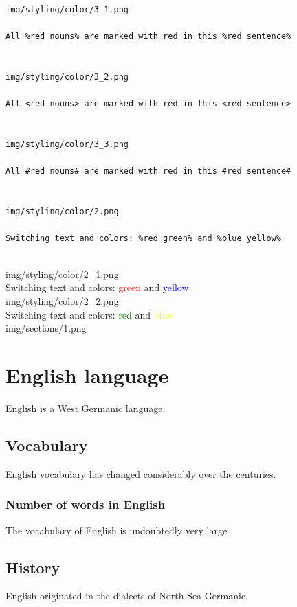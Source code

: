 \documentclass[14pt]{article}
\begin{document}
\begin{verbatim}

img/styling/color/3_1.png

All %red nouns% are marked with red in this %red sentence%


img/styling/color/3_2.png

All <red nouns> are marked with red in this <red sentence>


img/styling/color/3_3.png

All #red nouns# are marked with red in this #red sentence#


img/styling/color/2.png

Switching text and colors: %red green% and %blue yellow%


\end{verbatim}
\noindent
img/styling/color/2\_1.png\\[.5cm]
Switching text and colors: \textcolor{red}{green} and \textcolor{blue}{yellow}\\[.5cm]
img/styling/color/2\_2.png\\[.5cm]
Switching text and colors: \textcolor{green}{red} and \textcolor{yellow}{blue}\\[1.5cm]
img/sections/1.png
\section*{English language}
English is a West Germanic language.
\subsection*{Vocabulary}
English vocabulary has changed considerably over the centuries.
\subsubsection*{Number of words in English}
The vocabulary of English is undoubtedly very large.
\subsection*{History}
English originated in the dialects of North Sea Germanic.
\end{document}
